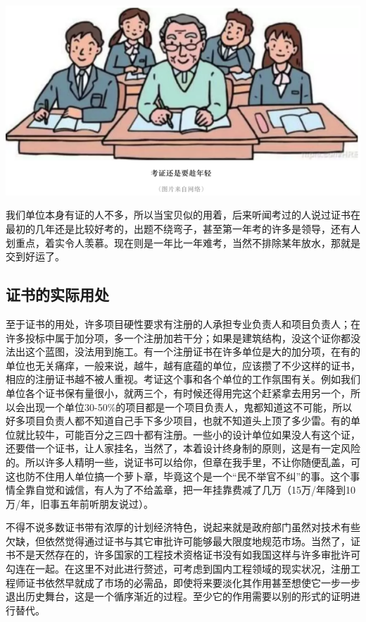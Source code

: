\documentclass[
]{book}
\begin{document}
\includegraphics[width=8.33in]{images/kaozheng4}

我们单位本身有证的人不多，所以当宝贝似的用着，后来听闻考过的人说过证书在最初的几年还是比较好考的，出题不绕弯子，甚至第一年考的许多是领导，还有人划重点，着实令人羡慕。现在则是一年比一年难考，当然不排除某年放水，那就是交到好运了。

\hypertarget{ux8bc1ux4e66ux7684ux5b9eux9645ux7528ux5904}{%
\subsection{证书的实际用处}\label{ux8bc1ux4e66ux7684ux5b9eux9645ux7528ux5904}}

至于证书的用处，许多项目硬性要求有注册的人承担专业负责人和项目负责人；在许多投标中属于加分项，多一个注册加若干分；如果是建筑结构，没这个证你都没法出这个蓝图，没法用到施工。有一个注册证书在许多单位是大的加分项，在有的单位也无关痛痒，一般来说，越牛，越有底蕴的单位，应该攒了不少这样的证书，相应的注册证书越不被人重视。考证这个事和各个单位的工作氛围有关。例如我们单位各个证书保有量很小，就两三个，有时候还得用完这个赶紧拿去用另一个，所以会出现一个单位30-50\%的项目都是一个项目负责人，鬼都知道这不可能，所以好多项目负责人都不知道自己手下多少项目，也就不知道头上顶了多少雷。有的单位就比较牛，可能百分之三四十都有注册。一些小的设计单位如果没人有这个证，还要借一个证书，让人家挂名，当然了，本着设计终身制的原则，这是有一定风险的。所以许多人精明一些，说证书可以给你，但章在我手里，不让你随便乱盖，可这也防不住用人单位搞一个萝卜章，毕竟这个是一个``民不举官不纠''的事。这个事情全靠自觉和诚信，有人为了不给盖章，把一年挂靠费减了几万（15万/年降到10万/年，旧事五年前听朋友说过）。

不得不说多数证书带有浓厚的计划经济特色，说起来就是政府部门虽然对技术有些欠缺，但依然觉得通过证书与其它审批许可能够最大限度地规范市场。当然了，证书不是天然存在的，许多国家的工程技术资格证书没有如我国这样与许多审批许可勾连在一起。在这里不对此进行赘述，可考虑到国内工程领域的现实状况，注册工程师证书依然早就成了市场的必需品，即使将来要淡化其作用甚至想使它一步一步退出历史舞台，这是一个循序渐近的过程。至少它的作用需要以别的形式的证明进行替代。
\end{document}
